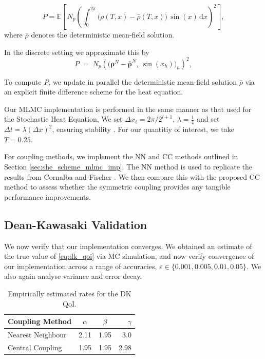 \begin{equation}\label{eq:dk_qoi}
P = \mathbb{E}\!\left[\,N_p \left(\int_0^{2\pi} 
\big(\rho(T,x)-\bar{\rho}(T,x)\big)\,\sin(x)\,\mathrm{d}x\right)^{\!2}\right],
\end{equation}
where $\bar\rho$ denotes the deterministic mean-field solution.

In the discrete setting we approximate this by
\begin{equation}
P \;=\; N_p \left( \big(\boldsymbol{\rho}^N - \boldsymbol{\bar\rho}^N,\ 
\sin(x_h)\big)_h \right)^{\!2},
\end{equation}

To compute $P$, we update in parallel the 
deterministic mean-field 
solution $\bar\rho$ via an explicit finite difference scheme for the 
heat equation.

Our MLMC implementation is performed in the same manner as that 
used for the Stochastic Heat Equation,
We set $\Delta x_\ell = 2 \pi / 2^{l + 1}$, $\lambda = \frac{1}{4}$
and set $\Delta t = \lambda (\Delta x)^2$, ensuring stability 
\cite{cornalba2025multilevel}.
For our quantitiy of interest, we take $T=0.25$.

For coupling methods, we implement the NN and CC methods outlined in 
Section \ref{sec:she_scheme_mlmc_imp}. The NN method is 
used to replicate the results from Cornalba and Fischer \cite{cornalba2025multilevel}.
We then compare this with the proposed CC method to assess 
whether the symmetric coupling provides any tangible performance 
improvements.

\subsection{Dean-Kawasaki Validation}\label{sec:dk_validation}

We now verify that our implementation converges. We obtained an estimate of the true 
value of \eqref{eq:dk_qoi} via MC simulation, and now verify convergence 
of our implementation across a range of accuracies, 
$\varepsilon \in \{0.001, 0.005, 0.01, 0.05\}$. We also again 
analyse variance and error decay.

\begin{table}[htbp]
    \centering
    \begin{tabular}{|l|c|c|r|}
        \hline
        \textbf{Coupling Method} & \textbf{$\alpha$} & \textbf{$\beta$} & \textbf{$\gamma$} \\
        \hline
        Nearest Neighbour & 2.11 & 1.95 & 3.0\\
        Central Coupling & 1.95 & 1.95 & 2.98 \\
        \hline
    \end{tabular}
    \caption{Empirically estimated rates for the DK QoI.}
    \label{tab:energy_decay_rates}
\end{table}

